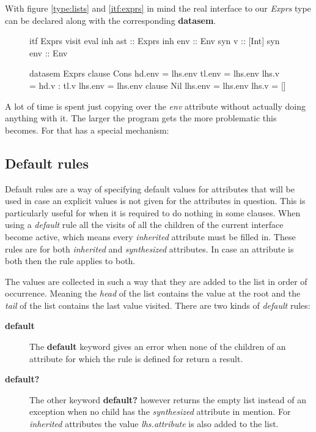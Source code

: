 With figure \ref{type:lists} and \ref{itf:exprs} in mind the real interface to our \emph{Exprs} type can be declared along with the corresponding \textbf{datasem}.

\begin{figure}
\begin{minipage}[t]{0.4\linewidth}
\begin{code}
itf Exprs
  visit eval 
    inh ast  :: Exprs
    inh env  :: Env
    syn v    :: [Int]
    syn env  :: Env
\end{code}
\end{minipage}
\begin{minipage}[t]{0.6\linewidth}
\begin{code}
datasem Exprs
   clause Cons
     hd.env   = lhs.env
     tl.env   = lhs.env
     lhs.v    = hd.v : tl.v
     lhs.env  = lhs.env
   clause Nil
     lhs.env  = lhs.env
     lhs.v    = []
\end{code}
\end{minipage}
\end{figure}

A lot of time is spent just copying over the \emph{env} attribute without actually doing anything with it. The larger the program gets the more problematic this becomes. For that \rcore has a special mechanism:

\subsection{Default rules}
Default rules are a way of specifying default values for attributes that will be used in case an explicit values is not given for the attributes in question. This is particularly useful for when it is required to do nothing in some clauses.
When using a \emph{default} rule all the visits of all the children of the current interface become active, which means every \emph{inherited} attribute must be filled in.
These rules are for both \emph{inherited} and \emph{synthesized} attributes. In case an attribute is both then the rule applies to both. 

The values are collected in such a way that they are added to the list in order of occurrence. Meaning the \emph{head} of the list contains the value at the root and the \emph{tail} of the list contains the last value visited. There are two kinds of \emph{default} rules:
\begin{description}
\item[\textbf{default}] { The \textbf{default} keyword gives an error when none of the children of an attribute for which the rule is defined for return a result. }
\item[\textbf{default?}] { The other keyword \textbf{default?} however returns the empty list instead of an exception when no child has the \emph{synthesized} attribute in mention. For \emph{inherited} attributes the value \emph{lhs.attribute} is also added to the list. }
\end{description}


